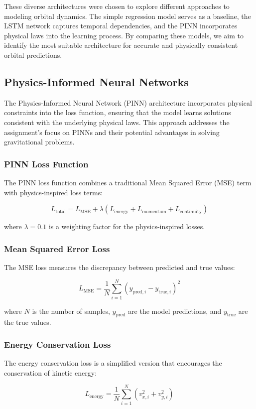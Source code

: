 \documentclass[12pt,a4paper]{article}
\begin{document}
These diverse architectures were chosen to explore different approaches to modeling orbital dynamics. The simple regression model serves as a baseline, the LSTM network captures temporal dependencies, and the PINN incorporates physical laws into the learning process. By comparing these models, we aim to identify the most suitable architecture for accurate and physically consistent orbital predictions.
\subsection{Physics-Informed Neural Networks}
The Physics-Informed Neural Network (PINN) architecture incorporates physical constraints into the loss function, ensuring that the model learns solutions consistent with the underlying physical laws. This approach addresses the assignment's focus on PINNs and their potential advantages in solving gravitational problems.

\subsubsection{PINN Loss Function}
The PINN loss function combines a traditional Mean Squared Error (MSE) term with physics-inspired loss terms:

\[ L_{\text{total}} = L_{\text{MSE}} + \lambda (L_{\text{energy}} + L_{\text{momentum}} + L_{\text{continuity}}) \]

where $\lambda = 0.1$ is a weighting factor for the physics-inspired losses.

\subsubsection{Mean Squared Error Loss}
The MSE loss measures the discrepancy between predicted and true values:

\[ L_{\text{MSE}} = \frac{1}{N} \sum_{i=1}^N (y_{\text{pred},i} - y_{\text{true},i})^2 \]

where $N$ is the number of samples, $y_{\text{pred}}$ are the model predictions, and $y_{\text{true}}$ are the true values.

\subsubsection{Energy Conservation Loss}
The energy conservation loss is a simplified version that encourages the conservation of kinetic energy:

\[ L_{\text{energy}} = \frac{1}{N} \sum_{i=1}^N (v_{x,i}^2 + v_{y,i}^2) \]
\end{document}
